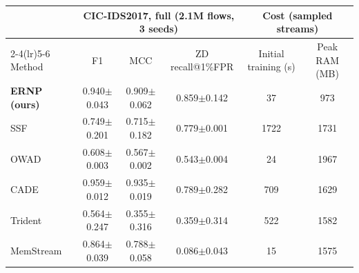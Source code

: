 \begin{tabular}{lccccc}
\toprule
 & \multicolumn{3}{c}{CIC-IDS2017, full (2.1M flows, 3 seeds)} & \multicolumn{2}{c}{Cost (sampled streams)}\\
\cmidrule(lr){2-4}\cmidrule(lr){5-6}
Method & F1 & MCC & ZD recall@1\%FPR & Initial training (s) & Peak RAM (MB)\\
\midrule
\textbf{ERNP (ours)} & 0.940$\pm$0.043 & 0.909$\pm$0.062 & 0.859$\pm$0.142 & 37 & 973\\
SSF & 0.749$\pm$0.201 & 0.715$\pm$0.182 & 0.779$\pm$0.001 & 1722 & 1731\\
OWAD & 0.608$\pm$0.003 & 0.567$\pm$0.002 & 0.543$\pm$0.004 & 24 & 1967\\
CADE & 0.959$\pm$0.012 & 0.935$\pm$0.019 & 0.789$\pm$0.282 & 709 & 1629\\
Trident & 0.564$\pm$0.247 & 0.355$\pm$0.316 & 0.359$\pm$0.314 & 522 & 1582\\
MemStream & 0.864$\pm$0.039 & 0.788$\pm$0.058 & 0.086$\pm$0.043 & 15 & 1575\\
\bottomrule
\end{tabular}
